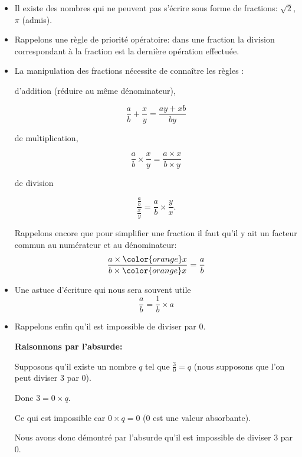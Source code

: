 \begin{rem}{}{}
\begin{itemize}
\item Il existe des nombres qui ne peuvent pas s'écrire sous forme de fractions: $\sqrt{2}$, $\pi$ (admis).
\item Rappelons une règle de priorité opératoire: dans une fraction la division correspondant à la fraction est la dernière opération effectuée.
\item La manipulation des fractions nécessite de connaître les règles :

\begin{minipage}{7cm}
\begin{center}
 d'addition (réduire au même dénominateur),
 \end{center} \[  \frac{a}{b}+\frac{x}{y}=\frac{ay+xb}{by} \] \end{minipage}
\vline
\begin{minipage}{5cm}
\begin{center}
 de multiplication,
 \end{center} \[  \frac{a}{b}\times \frac{x}{y}=\frac{a \times x}{b \times y} \] 
\end{minipage}
\vline
\begin{minipage}{4cm}
\begin{center}
de division 
\end{center}\[  \frac{ \frac{a}{b} }{ \frac{x}{y}}=\frac{a}{b}\times \frac{y}{x}. \] 
\end{minipage}

\medskip
Rappelons encore que pour simplifier une fraction il faut qu'il y ait un facteur \\commun au numérateur et au dénominateur: \[  \frac{a\times {\color{orange}x}}{b\times {\color{orange}x}}=\frac{a}{b} \]
\item Une astuce d'écriture qui nous sera souvent utile \[ \frac{a}{b}=\frac{1}{b}\times a \]
\item Rappelons enfin qu'il est impossible de diviser par $0$. 

\textbf{Raisonnons par l'absurde: }

Supposons qu'il existe un nombre $q$ tel que $\frac{3}{0}=q$ (nous supposons que l'on peut diviser $3$ par $0$). 

Donc $3=0\times q$. 

Ce qui est impossible car $0\times q=0$ ($0$ est une valeur absorbante). 

Nous avons donc démontré par l'absurde qu'il est impossible de diviser $3$ par $0$.
\end{itemize}
\end{rem}

